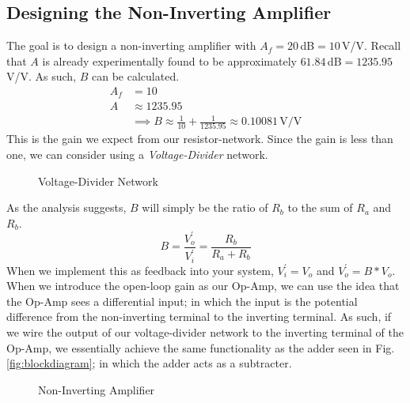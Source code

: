 \documentclass[lettersize,journal]{IEEEtran}
\begin{document}
\IEEEpubidadjcol

\subsection{Designing the Non-Inverting Amplifier}
The goal is to design a non-inverting amplifier with $A_f = 20\,$dB$=10\,$V/V. 
Recall that $A$ is already experimentally found to be approximately $61.84\,$dB$=1235.95\,$V/V.
As such, $B$ can be calculated.
\begin{align}
  A_f &= 10 \\
    A &\approx 1235.95 \\
      &\implies B \approx \frac{1}{10} + \frac{1}{1235.95} \approx 0.10081 \,\text{V/V}
\end{align}
This is the gain we expect from our resistor-network. Since the gain is less than 
one, we can consider using a \emph{Voltage-Divider} network.
\begin{figure}[H]
   \centering
  \caption{Voltage-Divider Network}
  \label{fig:resistorDivider}
\end{figure}
As the analysis suggests, $B$ will simply be the ratio of $R_b$ to the sum of $R_a$ and $R_b$.
\begin{equation}
  \label{eq:designB}
  B = \frac{V_o^\prime}{V_i^\prime} = \frac{R_b}{R_a+R_b}
\end{equation}
When we implement this as feedback into your system, $V_i^\prime = V_o$ and $V_o^\prime = B * V_o$.
When we introduce the open-loop gain as our Op-Amp, we can use the idea that the Op-Amp 
sees a differential input; in which the input is the potential difference from the non-inverting 
terminal to the inverting terminal. As such, if we wire the output of our voltage-divider network 
to the inverting terminal of the Op-Amp, we essentially achieve the same functionality as 
the adder seen in Fig. \ref{fig:blockdiagram}; in which the adder acts as a subtracter.

\begin{figure}[H]
  \centering
  \caption{Non-Inverting Amplifier}
  \label{fig:nonInvertingOpamp}
\end{figure}
\end{document}
